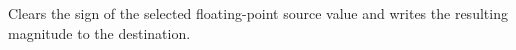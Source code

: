 Clears the sign of the selected floating-point source value and writes the resulting magnitude to the destination.
